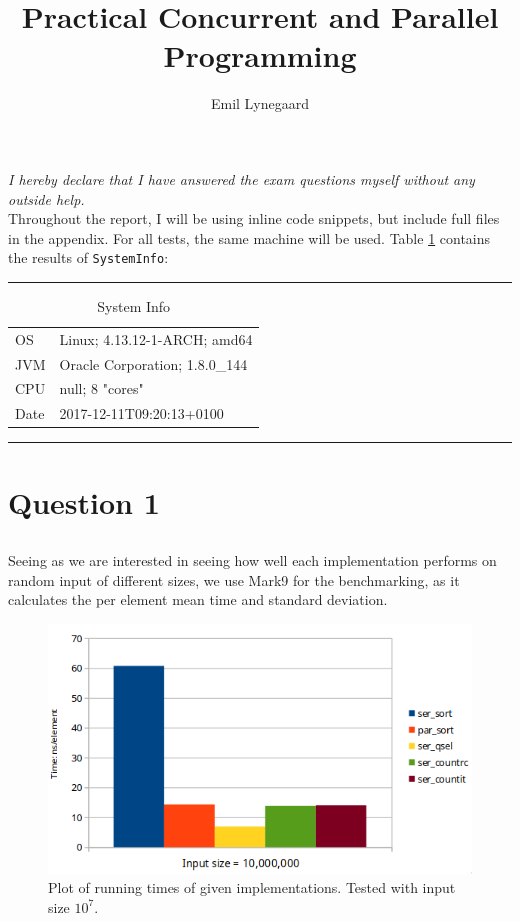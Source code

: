 \documentclass[a5paper]{article}
\title{Practical Concurrent and Parallel Programming}
\author{Emil Lynegaard}
\begin{document}


\newpage
\tableofcontents
\newpage

\maketitle
\textit{I hereby declare that I have answered the exam questions myself without any outside help.}\\

Throughout the report, I will be using inline code snippets, but include full files in the appendix. For all tests, the same machine will be used. Table \ref{table:sysinfo} contains the results of \texttt{SystemInfo}:

\par\noindent\rule{\textwidth}{0.4pt}
\begin{table}[!ht]
\begin{center}
\begin{tabular}{ l l }
OS & Linux; 4.13.12-1-ARCH; amd64\\
JVM & Oracle Corporation; 1.8.0\_144\\
CPU & null; 8 "cores"\\
Date & 2017-12-11T09:20:13+0100
\end{tabular}
\end{center}
\caption{System Info}
\label{table:sysinfo}
\end{table}
\par\noindent\rule{\textwidth}{0.4pt}
\newpage

\section{Question 1}
\subsection{}
Seeing as we are interested in seeing how well each implementation performs on random input of different sizes, we use Mark9 for the benchmarking, as it calculates the per element mean time and standard deviation.

\begin{figure}[!ht]
    \centering
    \noindent\includegraphics[scale=0.5]{res/graph_q1.png}
    \caption{Plot of running times of given implementations. Tested with input size $10^7$.}
    \label{fig:graphq1}
\end{figure}
\end{document}
